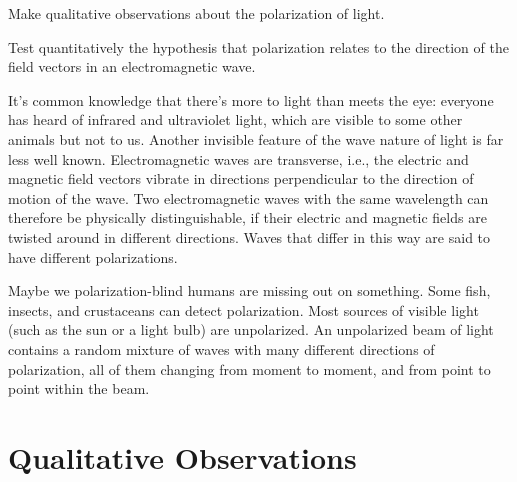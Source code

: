 \label{lab:polarization}

\apparatus
{}

\begin{goals}

\item[] Make qualitative observations about the polarization of light.

\item[] Test quantitatively the hypothesis that polarization
relates to the direction of the field vectors in an
electromagnetic wave.
\end{goals}

\introduction

 It's common knowledge that there's more to light than meets
the eye: everyone has heard of infrared and ultraviolet
light, which are visible to some other animals but not to
us. Another invisible feature of the wave nature of light is
far less well known. Electromagnetic waves are transverse,
i.e., the electric and magnetic field vectors vibrate in
directions perpendicular to the direction of motion of the
wave. Two electromagnetic waves with the same wavelength can
therefore be physically distinguishable, if their electric
and magnetic fields are twisted around in different
directions. Waves that differ in this way are said to have
different polarizations.


Maybe we polarization-blind humans are missing out on
something. Some fish, insects, and crustaceans can detect
polarization. Most sources of
visible light (such as the sun or a light bulb) are
unpolarized. An unpolarized beam of light contains a random
mixture of waves with many different directions of
polarization, all of them changing from moment to moment,
and from point to point within the beam.

\section{Qualitative Observations}

